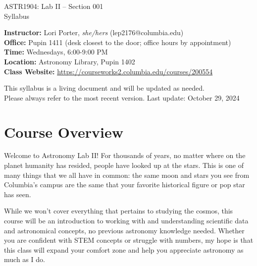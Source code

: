 \documentclass[11pt]{article}
\begin{document}
\begin{center}
\LARGE{ASTR1904: Lab II -- Section 001} \\ \medskip \Large{Syllabus}\\ 
\end{center}

\noindent
\textbf{Instructor:} Lori Porter, \textit{she/hers} (lep2176@columbia.edu)\\
\textbf{Office:} Pupin 1411 (desk closest to the door; office hours by appointment)\\ 
\textbf{Time:} {Wednesdays, 6:00-9:00 PM} \\
\textbf{Location:} {Astronomy Library, Pupin 1402} \\
\textbf{Class Website:} {\href{https://courseworks2.columbia.edu/courses/200554}{https://courseworks2.columbia.edu/courses/200554}} \\

{\begin{center}
    This syllabus is a living document and will be updated as needed. \\ Please always refer to the most recent version. Last update: October 29, 2024
\end{center} }

\section*{Course Overview}

Welcome to Astronomy Lab II! For thousands of years, no matter where on the planet humanity has resided, people have looked up at the stars. This is one of many things that we all have in common: the same moon and stars you see from Columbia's campus are the same that your favorite historical figure or pop star has seen. 

While we won't cover everything that pertains to studying the cosmos, this course will be an introduction to working with and understanding scientific data and astronomical concepts, no previous astronomy knowledge needed. Whether you are confident with STEM concepts or struggle with numbers, my hope is that this class will expand your comfort zone and help you appreciate astronomy as much as I do.

\end{document}

